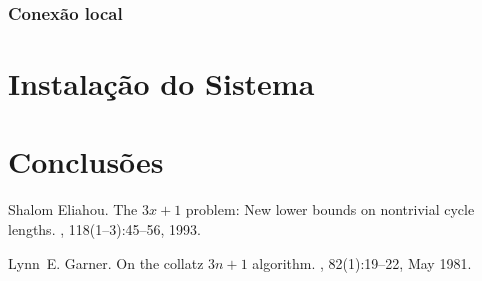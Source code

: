 \documentclass[11pt,twoside,a4paper]{report}
\begin{document}
\subsection{Conexão local}


\cleardoublepage
\chapter{Instalação do Sistema}

\cleardoublepage
\chapter{Conclusões}


%
%
\cleardoublepage
\iffalse
  
\else
  \begin{thebibliography}{10}

  Shalom Eliahou.
  \newblock The $3x+1$ problem: New lower bounds on nontrivial cycle lengths.
  , 118(1--3):45--56, 1993.

  Lynn~E. Garner.
  \newblock On the collatz $3n+1$ algorithm.
  , 82(1):19--22,
    May 1981.
  \end{thebibliography}
\fi
\cleardoublepage
\end{document}
